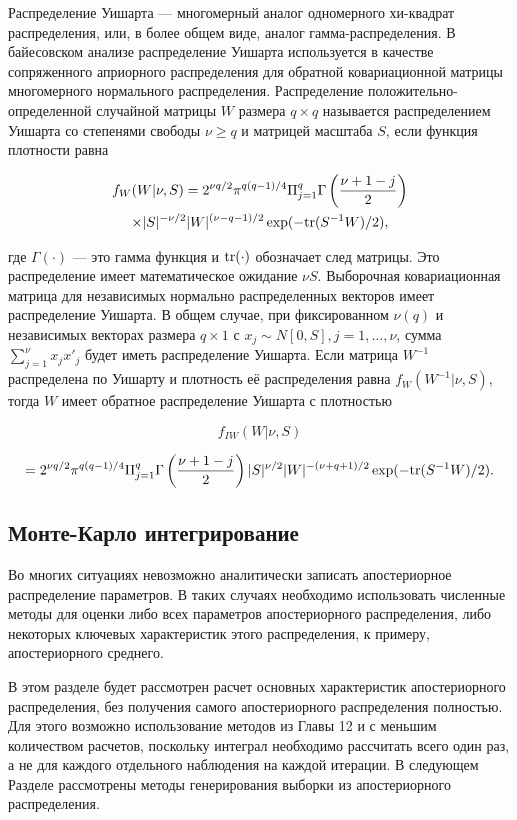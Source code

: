 Распределение Уишарта --- многомерный аналог одномерного хи-квадрат распределения, или, в более общем виде, аналог гамма-распределения. В байесовском анализе распределение Уишарта используется в качестве сопряженного априорного распределения для обратной ковариационной матрицы многомерного нормального распределения. Распределение положительно-определенной случайной матрицы $W$ размера  $q\times q$  называется распределением Уишарта со степенями свободы  $\nu{\geq}q$ и матрицей масштаба $S$, если функция плотности равна

\begin{multline}
f_{W}(W|\nu,S)=2^{{\nu}q/2}\pi^{q(q-1)/4}\Pi^{q}_{j=1}\Gamma\left(\dfrac{\nu+1-j}{2}\right) \\
\times|S|^{-{\nu}/2}|W|^{(\nu-q-1)/2}\exp(-\mathrm{tr}(S^{-1}W)/2), 
\end{multline}

где $\Gamma(\cdot)$ --- это гамма функция и $\mathrm{tr}(\cdot)$ обозначает след матрицы. Это распределение имеет математическое ожидание $\nu S$. Выборочная ковариационная матрица для независимых  нормально распределенных векторов имеет  распределение Уишарта. В общем случае, при фиксированном  $\nu(q)$ и независимых векторах размера $q{\times}1$ с $x_j{\sim}N[0,S], j=1,\ldots ,\nu$, сумма $\sum^{\nu}_{j=1}x_{j}x'_j$ будет иметь распределение Уишарта. Если матрица $W^{-1}$  распределена по Уишарту и плотность её распределения равна $f_{W}(W^{-1}|\nu,S)$, тогда $W$ имеет обратное распределение Уишарта  с плотностью

\[
f_{IW}(W|\nu,S)
\]

\[
=2^{{\nu}q/2}\pi^{q(q-1)/4}\Pi^{q}_{j=1}\Gamma\left(\dfrac{\nu+1-j}{2}\right)|S|^{\nu/2}|W|^{-(\nu+q+1)/2}\exp(-\mathrm{tr}(S^{-1}W)/2). 
\]

\subsection{Монте-Карло интегрирование}

Во многих ситуациях невозможно аналитически записать апостериорное распределение параметров. В таких случаях необходимо использовать численные методы для оценки либо всех параметров апостериорного распределения, либо некоторых ключевых характеристик этого распределения, к примеру, апостериорного среднего.

В этом разделе будет рассмотрен расчет основных характеристик апостериорного распределения, без получения самого апостериорного распределения полностью. Для этого возможно использование методов из Главы 12 и с меньшим количеством расчетов, поскольку интеграл необходимо рассчитать всего один раз, а не для каждого отдельного наблюдения на каждой итерации. В следующем Разделе рассмотрены методы генерирования выборки из апостериорного распределения.

